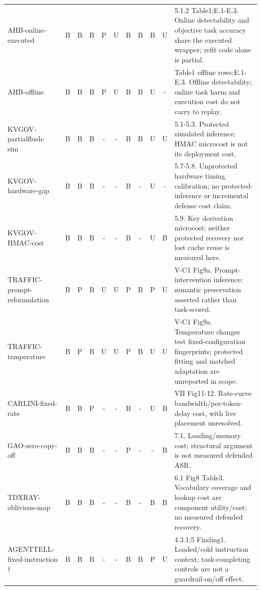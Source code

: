 \begin{longtable}{@{}p{}*{9}{c}p{}@{}}
AHB-\allowbreak{}online-\allowbreak{}executed~\cite{zhu2026turing} & B & B & B & P & U & B & B & B & U & 5.1.2 Table1;E.1-E.3. Online detectability and objective task accuracy share the executed wrapper; refit code alone is partial.\\
AHB-\allowbreak{}offline~\cite{zhu2026turing} & B & B & B & P & U & B & B & U & - & Table1 offline rows;E.1-E.3. Offline detectability; online task harm and execution cost do not carry to replay.\\
KVGOV-\allowbreak{}partialflush-\allowbreak{}sim~\cite{addagada2026kvgov} & B & B & B & - & - & B & B & U & U & 5.1-5.3. Protected simulated inference; HMAC microcost is not its deployment cost.\\
KVGOV-\allowbreak{}hardware-\allowbreak{}gap~\cite{addagada2026kvgov} & B & B & B & - & - & B & - & U & - & 5.7-5.8. Unprotected hardware timing calibration; no protected-inference or incremental defense cost claim.\\
KVGOV-\allowbreak{}HMAC-\allowbreak{}cost~\cite{addagada2026kvgov} & B & B & B & - & - & B & - & U & B & 5.9. Key derivation microcost; neither protected recovery nor lost cache reuse is measured here.\\
TRAFFIC-\allowbreak{}prompt-\allowbreak{}reformulation~\cite{pouryousef2026traffic} & B & P & B & U & U & P & B & P & U & V-C1 Fig9a. Prompt-intervention inference; semantic preservation asserted rather than task-scored.\\
TRAFFIC-\allowbreak{}temperature~\cite{pouryousef2026traffic} & B & P & B & U & U & P & B & U & U & V-C1 Fig9a. Temperature changes test fixed-configuration fingerprints; protected fitting and matched adaptation are unreported in scope.\\
CARLINI-\allowbreak{}fixed-\allowbreak{}rate~\cite{carlini2024remote} & B & B & P & - & - & B & - & U & B & VII Fig11-12. Rate-curve bandwidth/per-token-delay cost, with live placement unresolved.\\
GAO-\allowbreak{}zero-\allowbreak{}copy-\allowbreak{}off~\cite{gao2025iknow} & B & B & B & - & - & P & - & - & B & 7.1. Loading/memory cost; structural argument is not measured defended ASR.\\
TDXRAY-\allowbreak{}oblivious-\allowbreak{}map~\cite{hornetz2026tdxray} & B & B & B & - & - & B & - & B & B & 6.1 Fig8 Table3. Vocabulary coverage and lookup cost are component utility/cost; no measured defended recovery.\\
AGENTTELL-\allowbreak{}fixed-\allowbreak{}instruction$\dagger$~\cite{shahriar2026agenttell} & B & B & B & - & - & B & B & P & U & 4.3.1;5 Finding1. Loaded/cold instruction context; task-completing controls are not a guardrail-on/off effect.\\

\end{longtable}
